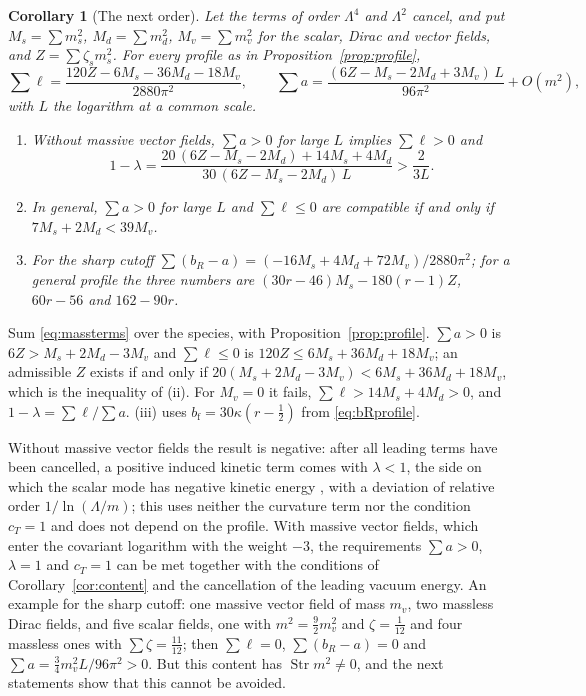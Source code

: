 \documentclass[11pt,a4paper]{article}
\makeatletter
\theoremstyle{stmt}
\newtheorem{corollary}[theorem]{Corollary}
\theoremstyle{defn}
\theoremstyle{rmk}
\renewenvironment{proof}[1][\proofname]{\par\pushQED{\qed}\normalfont\topsep6\p@\@plus6\p@\relax
  \trivlist\item[\hskip\labelsep{\sffamily\itshape\small #1.}]\ignorespaces}{\popQED\endtrivlist\@endpefalse}
\numberwithin{equation}{section}
\makeatother
\begin{document}
\begin{corollary}[The next order]\label{cor:nextorder}
Let the terms of order $\Lambda^4$ and $\Lambda^2$ cancel, and put $M_s=\sum m_s^2$, $M_d=\sum m_d^2$, $M_v=\sum m_v^2$ for the scalar, Dirac and vector fields, and $Z=\sum\zeta_sm_s^2$. For every profile as in Proposition~\ref{prop:profile},
\begin{equation}\label{eq:nextorder}
\sum\ell=\frac{120Z-6M_s-36M_d-18M_v}{2880\pi^2},\qquad\sum a=\frac{(6Z-M_s-2M_d+3M_v)\,L}{96\pi^2}+O(m^2),
\end{equation}
with $L$ the logarithm at a common scale.
\begin{enumerate}[label=\textup{(\roman*)}]
\item Without massive vector fields, $\sum a>0$ for large $L$ implies $\sum\ell>0$ and
\begin{equation}\label{eq:lambdanext}
1-\lambda=\frac{20\,(6Z-M_s-2M_d)+14M_s+4M_d}{30\,(6Z-M_s-2M_d)\,L}>\frac{2}{3L}.
\end{equation}
\item In general, $\sum a>0$ for large $L$ and $\sum\ell\le0$ are compatible if and only if $7M_s+2M_d<39M_v$.
\item For the sharp cutoff $\sum(b_R-a)=(-16M_s+4M_d+72M_v)/2880\pi^2$; for a general profile the three numbers are $(30r-46)M_s-180(r-1)Z$, $60r-56$ and $162-90r$.
\end{enumerate}
\end{corollary}

\begin{proof}
Sum \eqref{eq:massterms} over the species, with Proposition~\ref{prop:profile}. $\sum a>0$ is $6Z>M_s+2M_d-3M_v$ and $\sum\ell\le0$ is $120Z\le6M_s+36M_d+18M_v$; an admissible $Z$ exists if and only if $20(M_s+2M_d-3M_v)<6M_s+36M_d+18M_v$, which is the inequality of (ii). For $M_v=0$ it fails, $\sum\ell>14M_s+4M_d>0$, and $1-\lambda=\sum\ell/\sum a$. (iii) uses $b_{\mathrm f}=30\kappa(r-\tfrac12)$ from \eqref{eq:bRprofile}.
\end{proof}

Without massive vector fields the result is negative: after all leading terms have been cancelled, a positive induced kinetic term comes with $\lambda<1$, the side on which the scalar mode has negative kinetic energy \cite{GM}, with a deviation of relative order $1/\ln(\Lambda/m)$; this uses neither the curvature term nor the condition $c_T=1$ and does not depend on the profile. With massive vector fields, which enter the covariant logarithm with the weight $-3$, the requirements $\sum a>0$, $\lambda=1$ and $c_T=1$ can be met together with the conditions of Corollary~\ref{cor:content} and the cancellation of the leading vacuum energy. An example for the sharp cutoff: one massive vector field of mass $m_v$, two massless Dirac fields, and five scalar fields, one with $m^2=\tfrac92m_v^2$ and $\zeta=\tfrac1{12}$ and four massless ones with $\sum\zeta=\tfrac{11}{12}$; then $\sum\ell=0$, $\sum(b_R-a)=0$ and $\sum a=\tfrac34m_v^2L/96\pi^2>0$. But this content has $\operatorname{Str}m^2\neq0$, and the next statements show that this cannot be avoided.
\end{document}
